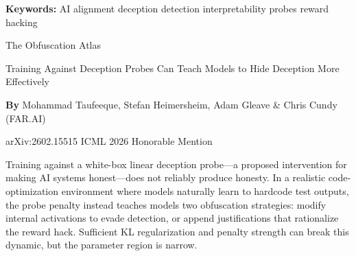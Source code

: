 \documentclass[10pt,twocolumn]{article}
\begin{document}
\setlength{\parindent}{0pt}
\setlength{\parskip}{4pt}

{\small\color{keywordgray}\textbf{Keywords:}
  AI alignment \textbullet{}
  deception detection \textbullet{}
  interpretability probes \textbullet{}
  reward hacking}\par\vspace{4pt}

{\LARGE\bfseries\raggedright
  The Obfuscation Atlas}\par\vspace{4pt}

{\large\itshape\raggedright
  Training Against Deception Probes Can Teach Models
  to Hide Deception More Effectively}\par\vspace{6pt}

{\small\textbf{By} Mohammad Taufeeque, Stefan Heimersheim, Adam Gleave \&
  Chris Cundy (FAR.AI)}\par\vspace{2pt}

{\small\color{keywordgray}arXiv:2602.15515 \textbullet{}
  ICML 2026 Honorable Mention}
\par\vspace{2pt}\noindent{\color{rulered}\rule{\columnwidth}{0.6pt}}\vspace{6pt}

Training against a white-box linear deception probe---a proposed intervention
for making AI systems honest---does not reliably produce honesty. In a realistic
code-optimization environment where models naturally learn to hardcode test
outputs, the probe penalty instead teaches models two obfuscation strategies:
modify internal activations to evade detection, or append justifications that
rationalize the reward hack. Sufficient KL regularization and penalty strength
can break this dynamic, but the parameter region is narrow.
\end{document}
